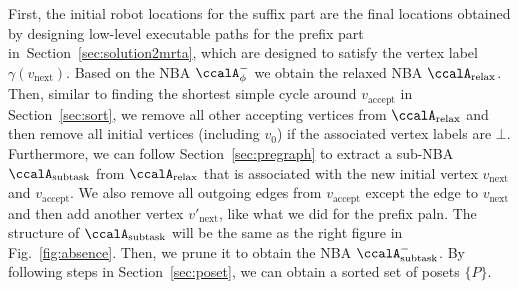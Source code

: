 \documentclass[Afour,sageh,times]{sagej}
\newcommand{\auto}[1]{\ccalA_{\text{#1}}}
\newcommand{\autop}{\ccalA_{\phi}}
\begin{document}
{{{  First, the initial robot locations for the suffix part are the final locations obtained by designing low-level executable paths for the prefix part in~Section~\ref{sec:solution2mrta}, which are designed to satisfy the vertex label $\gamma(v_{\text{next}})$.  Based on the NBA $\autop^-$ we obtain the relaxed NBA $\auto{relax}$.  Then, similar to finding the shortest simple cycle around $v_{\text{accept}}$ in Section~\ref{sec:sort}, we remove all other accepting vertices from $\auto{relax}$ and then remove all initial vertices (including $v_0$) if the associated vertex labels are $\bot$. Furthermore, we can follow Section~\ref{sec:pregraph} to  extract a sub-NBA $\auto{subtask}$ from $\auto{relax}$ that is associated with the new initial vertex $v_{\text{next}}$ and $v_{\text{accept}}$. We also remove all outgoing edges from $v_{\text{accept}}$ except the edge to $v_{\text{next}}$ and then add another vertex $v'_{\text{next}}$, like what we did for the prefix paln. The structure of $\auto{subtask}$ will be the same as the right figure in Fig.~\ref{fig:absence}. Then, we  prune it to obtain the NBA $\auto{subtask}^-$. By following steps in Section~\ref{sec:poset}, we can obtain a sorted set of posets $\{P\}$.}

}}
\end{document}
